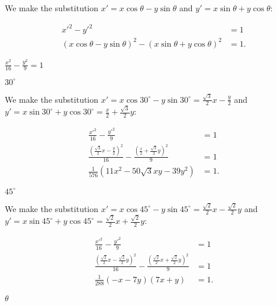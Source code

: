 \documentclass[../gatm_answers.tex]{subfiles}
\begin{document}
\noindent We make the substitution $x'=x \cos \theta - y\sin \theta$ and $y'=x\sin \theta + y\cos \theta$:

\begin{align*}
x'^2-y'^2&=1 \\
(x \cos \theta - y\sin \theta)^2 - (x\sin \theta + y\cos \theta)^2 &= 1.
\end{align*}

\begin{inner_problem}
\item $\frac{x^2}{16}-\frac{y^2}{9}=1$
\end{inner_problem}

\begin{iinner_problem}[start=1]
\item $30^\circ$
\end{iinner_problem}

\noindent We make the substitution $x'=x \cos 30^\circ - y\sin 30^\circ=\frac{\sqrt{3}}{2}x-\frac{y}{2}$ and $y'=x\sin 30^\circ + y\cos 30^\circ=\frac{x}{2}+\frac{\sqrt{3}}{2}y$:

\begin{align*}
\frac{x'^2}{16}-\frac{y'^2}{9} &= 1 \\
\frac{\left(\frac{\sqrt{3}}{2}x-\frac{y}{2}\right)^2}{16} - \frac{\left(\frac{x}{2}+\frac{\sqrt{3}}{2}y\right)^2}{9} &= 1 \\
\frac{1}{576} (11 x^2 - 50 \sqrt{3} x y - 39 y^2) &= 1.
\end{align*}

\begin{iinner_problem}
\item $45^\circ$
\end{iinner_problem}

\noindent We make the substitution $x'=x \cos 45^\circ - y\sin 45^\circ=\frac{\sqrt{2}}{2}x-\frac{\sqrt{2}}{2}y$ and $y'=x\sin 45^\circ + y\cos 45^\circ=\frac{\sqrt{2}}{2}x+\frac{\sqrt{2}}{2}y$:

\begin{align*}
\frac{x'^2}{16}-\frac{y'^2}{9} &= 1 \\
\frac{\left(\frac{\sqrt{2}}{2}x-\frac{\sqrt{2}}{2}y\right)^2}{16} - \frac{\left(\frac{\sqrt{2}}{2}x+\frac{\sqrt{2}}{2}y\right)^2}{9} &= 1 \\
\frac{1}{288} (-x - 7 y) (7 x + y) &= 1.
\end{align*}

\begin{iinner_problem}
\item $\theta$
\end{iinner_problem}
\end{document}
